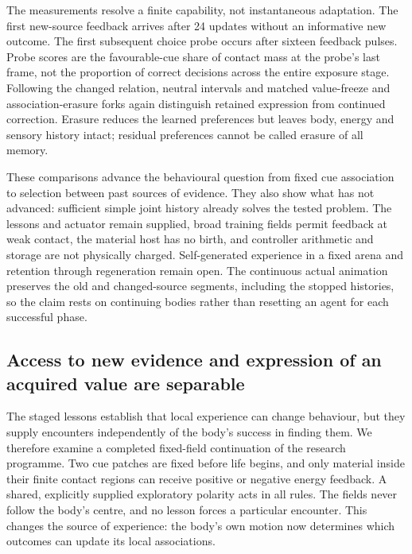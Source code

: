 The measurements resolve a finite capability, not instantaneous adaptation. The first new-source feedback arrives after 24 updates without an informative new outcome. The first subsequent choice probe occurs after sixteen feedback pulses. Probe scores are the favourable-cue share of contact mass at the probe's last frame, not the proportion of correct decisions across the entire exposure stage. Following the changed relation, neutral intervals and matched value-freeze and association-erasure forks again distinguish retained expression from continued correction. Erasure reduces the learned preferences but leaves body, energy and sensory history intact; residual preferences cannot be called erasure of all memory.

These comparisons advance the behavioural question from fixed cue association to selection between past sources of evidence. They also show what has not advanced: sufficient simple joint history already solves the tested problem. The lessons and actuator remain supplied, broad training fields permit feedback at weak contact, the material host has no birth, and controller arithmetic and storage are not physically charged. Self-generated experience in a fixed arena and retention through regeneration remain open. The continuous actual animation preserves the old and changed-source segments, including the stopped histories, so the claim rests on continuing bodies rather than resetting an agent for each successful phase.






\subsection*{Access to new evidence and expression of an acquired value are separable}

The staged lessons establish that local experience can change behaviour, but they supply encounters independently of the body's success in finding them. We therefore examine a completed fixed-field continuation of the research programme. Two cue patches are fixed before life begins, and only material inside their finite contact regions can receive positive or negative energy feedback. A shared, explicitly supplied exploratory polarity acts in all rules. The fields never follow the body's centre, and no lesson forces a particular encounter. This changes the source of experience: the body's own motion now determines which outcomes can update its local associations.

